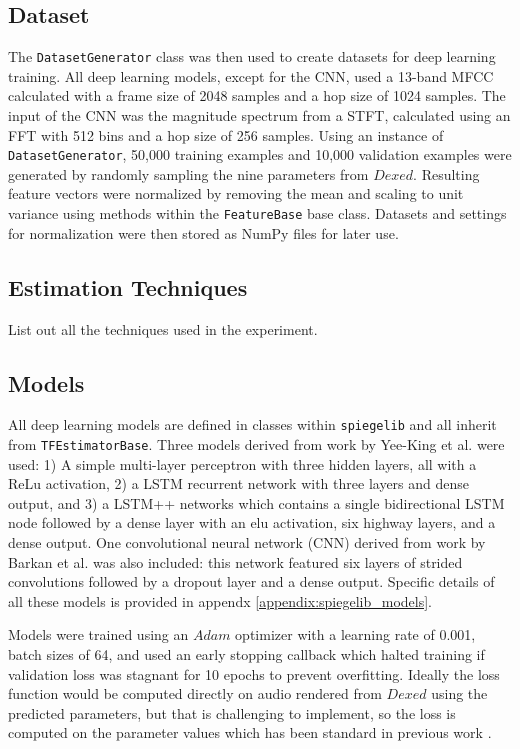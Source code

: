 \subsection{Dataset}
The \texttt{DatasetGenerator} class was then used to create datasets for deep learning training. All deep learning models, except for the CNN, used a 13-band MFCC calculated with a frame size of 2048 samples and a hop size of 1024 samples. The input of the CNN was the magnitude spectrum from a STFT, calculated using an FFT with 512 bins and a hop size of 256 samples. Using an instance of \texttt{DatasetGenerator}, 50,000 training examples and 10,000 validation examples were generated by randomly sampling the nine parameters from $Dexed$. Resulting feature vectors were normalized by removing the mean and scaling to unit variance using methods within the \texttt{FeatureBase} base class. Datasets and settings for normalization were then stored as NumPy files for later use.

\subsection{Estimation Techniques}
List out all the techniques used in the experiment.

\subsection{Models}
All deep learning models are defined in classes within \texttt{spiegelib} and all inherit from \texttt{TFEstimatorBase}. Three models derived from work by Yee-King et al. \cite{yee2018automatic} were used: 1) A simple multi-layer perceptron with three hidden layers, all with a ReLu activation, 2) a LSTM recurrent network with three layers and dense output, and 3) a LSTM++ networks which contains a single bidirectional LSTM node followed by a dense layer with an elu activation, six highway layers, and a dense output. One convolutional neural network (CNN) derived from work by Barkan et al. \cite{barkan2019inversynth} was also included: this network featured six layers of strided convolutions followed by a dropout layer and a dense output. Specific details of all these models is provided in appendx \ref{appendix:spiegelib_models}.

Models were trained using an $Adam$ optimizer \cite{kingma2014adam} with a learning rate of 0.001, batch sizes of 64, and used an early stopping callback which halted training if validation loss was stagnant for 10 epochs to prevent overfitting. Ideally the loss function would be computed directly on audio rendered from $Dexed$ using the predicted parameters, but that is challenging to implement, so the loss is computed on the parameter values which has been standard in previous work \cite{yee2018automatic, barkan2019inversynth}.

